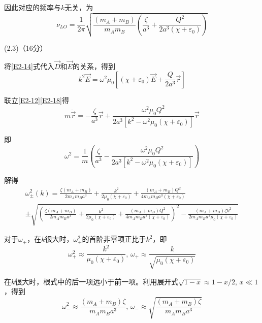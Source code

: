 \documentclass[10pt,a4paper,onecolumn,UTF8]{ctexart}
\begin{document}
	因此对应的频率与$k$无关，为
	\begin{equation}\label{E2-17}
		\nu_{LO}=\frac 1 {2\pi}\sqrt{\frac{(m_A+m_B)}{m_Am_B}\left(\frac{\zeta}{a^3}+\frac{Q^2}{2a^3(\chi+\varepsilon_0)}\right)}
	\end{equation}
	
	(2.3)（16分）
	
	将\eqref{E2-14}式代入$\vec D$和$\vec E$的关系，得到
	\begin{equation}\label{E2-18}
		k^2\vec{E}=\omega^2\mu_0\left[(\chi+\varepsilon_0)\vec E+\frac{Q}{2a^3}\vec r\right]
	\end{equation}
	
	联立\eqref{E2-12}\eqref{E2-18}得
	\begin{equation}\label{E2-19}
		m\ddot{\vec r}=-\frac{\zeta}{a^3}\vec r+\frac{\omega^2\mu_0Q^2}{2a^3\left[k^2-\omega^2\mu_0(\chi+\varepsilon_0)\right]}\vec r
	\end{equation}
	
	即
	\begin{equation}\label{E2-20}
		\omega^2=\frac{1}{m}\left(\frac{\zeta}{a^3}-\frac{\omega^2\mu_0Q^2}{2a^3\left[k^2-\omega^2\mu_0(\chi+\varepsilon_0)\right]}\right)
	\end{equation}
	
	解得
	\begin{multline}\label{E2-21}
		\omega^2_{\pm}(k)=\frac{\zeta(m_A+m_B)}{2m_Am_Ba^3}+\frac{k^2}{2\mu_0(\chi+\varepsilon_0)}+\frac{(m_A+m_B)Q^2}{4m_Am_Ba^3(\chi+\varepsilon_0)}\\ \pm\sqrt{\left(\frac{\zeta(m_A+m_B)}{2m_Am_Ba^3}+\frac{k^2}{2\mu_0(\chi+\varepsilon_0)}+\frac{(m_A+m_B)Q^2}{4m_Am_Ba^3(\chi+\varepsilon_0)}\right)^2-\frac{(m_A+m_B)\zeta k^2}{2m_Am_Ba^3\mu_0(\chi+\varepsilon_0)}}
	\end{multline}
	
	对于$\omega_+$，在$k$很大时，$\omega_+^2$的首阶非零项正比于$k^2$，即
	\begin{equation}\label{E2-22}
		\omega^2_+\approx\frac{k^2}{\mu_0(\chi+\varepsilon_0)},\,\omega_+\approx\frac{k}{\sqrt{\mu_0(\chi+\varepsilon_0)}}
	\end{equation}
	
	在$k$很大时，根式中的后一项远小于前一项。利用展开式$\sqrt{1-x}\approx 1-x/2,\,x\ll1$，得到
	\begin{equation}\label{E2-23}
		\omega_-^2\approx\frac{(m_A+m_B)\zeta }{m_Am_Ba^3},\,\omega_-\approx\sqrt{\frac{(m_A+m_B)\zeta }{m_Am_Ba^3}}
	\end{equation}
	
\end{document}
